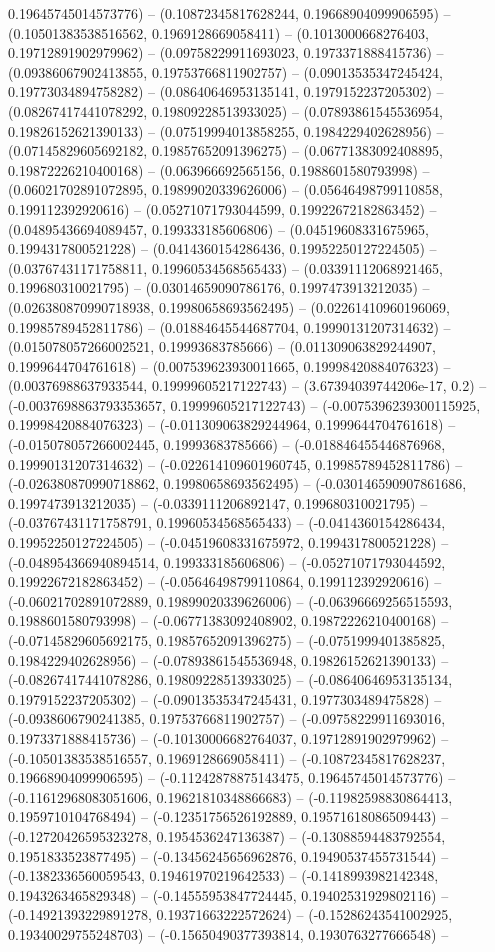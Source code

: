 0.19645745014573776) -- (0.10872345817628244, 0.19668904099906595) -- (0.10501383538516562, 0.1969128669058411) -- (0.1013000668276403, 0.19712891902979962) -- (0.09758229911693023, 0.1973371888415736) -- (0.09386067902413855, 0.19753766811902757) -- (0.09013535347245424, 0.19773034894758282) -- (0.08640646953135141, 0.1979152237205302) -- (0.08267417441078292, 0.19809228513933025) -- (0.07893861545536954, 0.19826152621390133) -- (0.07519994013858255, 0.1984229402628956) -- (0.07145829605692182, 0.19857652091396275) -- (0.06771383092408895, 0.19872226210400168) -- (0.063966692565156, 0.1988601580793998) -- (0.06021702891072895, 0.19899020339626006) -- (0.05646498799110858, 0.199112392920616) -- (0.05271071793044599, 0.19922672182863452) -- (0.04895436694089457, 0.199333185606806) -- (0.04519608331675965, 0.1994317800521228) -- (0.0414360154286436, 0.19952250127224505) -- (0.03767431171758811, 0.19960534568565433) -- (0.03391112068921465, 0.199680310021795) -- (0.03014659090786176, 0.1997473913212035) -- (0.026380870990718938, 0.19980658693562495) -- (0.02261410960196069, 0.19985789452811786) -- (0.01884645544687704, 0.19990131207314632) -- (0.015078057266002521, 0.19993683785666) -- (0.011309063829244907, 0.1999644704761618) -- (0.007539623930011665, 0.19998420884076323) -- (0.00376988637933544, 0.19999605217122743) -- (3.67394039744206e-17, 0.2) -- (-0.0037698863793353657, 0.19999605217122743) -- (-0.0075396239300115925, 0.19998420884076323) -- (-0.011309063829244964, 0.1999644704761618) -- (-0.015078057266002445, 0.19993683785666) -- (-0.018846455446876968, 0.19990131207314632) -- (-0.022614109601960745, 0.19985789452811786) -- (-0.026380870990718862, 0.19980658693562495) -- (-0.030146590907861686, 0.1997473913212035) -- (-0.0339111206892147, 0.199680310021795) -- (-0.03767431171758791, 0.19960534568565433) -- (-0.0414360154286434, 0.19952250127224505) -- (-0.04519608331675972, 0.1994317800521228) -- (-0.048954366940894514, 0.199333185606806) -- (-0.05271071793044592, 0.19922672182863452) -- (-0.05646498799110864, 0.199112392920616) -- (-0.06021702891072889, 0.19899020339626006) -- (-0.06396669256515593, 0.1988601580793998) -- (-0.06771383092408902, 0.19872226210400168) -- (-0.07145829605692175, 0.19857652091396275) -- (-0.0751999401385825, 0.1984229402628956) -- (-0.07893861545536948, 0.19826152621390133) -- (-0.08267417441078286, 0.19809228513933025) -- (-0.08640646953135134, 0.1979152237205302) -- (-0.09013535347245431, 0.1977303489475828) -- (-0.0938606790241385, 0.19753766811902757) -- (-0.09758229911693016, 0.1973371888415736) -- (-0.10130006682764037, 0.19712891902979962) -- (-0.10501383538516557, 0.1969128669058411) -- (-0.10872345817628237, 0.19668904099906595) -- (-0.11242878875143475, 0.19645745014573776) -- (-0.11612968083051606, 0.19621810348866683) -- (-0.11982598830864413, 0.1959710104768494) -- (-0.12351756526192889, 0.19571618086509443) -- (-0.12720426595323278, 0.1954536247136387) -- (-0.13088594483792554, 0.1951833523877495) -- (-0.13456245656962876, 0.19490537455731544) -- (-0.1382336560059543, 0.19461970219642533) -- (-0.1418993982142348, 0.1943263465829348) -- (-0.14555953847724445, 0.19402531929802116) -- (-0.14921393229891278, 0.19371663222572624) -- (-0.15286243541002925, 0.19340029755248703) -- (-0.15650490377393814, 0.1930763277666548) -- 